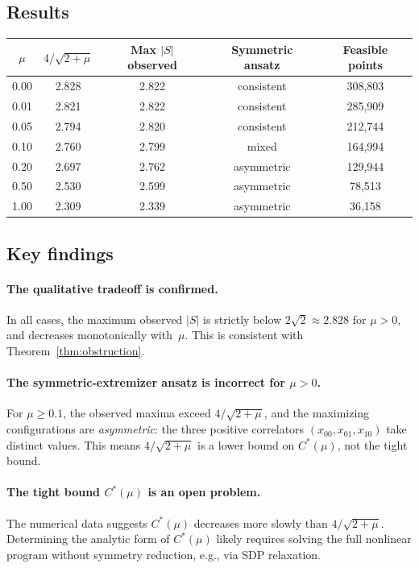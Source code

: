 \documentclass[11pt,a4paper]{article}
\theoremstyle{definition}
\theoremstyle{remark}
\begin{document}
\subsection{Results}

\begin{center}
\begin{tabular}{@{}ccccc@{}}
\toprule
$\mu$ & $4/\sqrt{2+\mu}$ & Max $|S|$ observed & Symmetric ansatz & Feasible points \\
\midrule
0.00 & 2.828 & 2.822 & consistent & 308{,}803 \\
0.01 & 2.821 & 2.822 & consistent & 285{,}909 \\
0.05 & 2.794 & 2.820 & consistent & 212{,}744 \\
0.10 & 2.760 & 2.799 & mixed & 164{,}994 \\
0.20 & 2.697 & 2.762 & asymmetric & 129{,}944 \\
0.50 & 2.530 & 2.599 & asymmetric & 78{,}513 \\
1.00 & 2.309 & 2.339 & asymmetric & 36{,}158 \\
\bottomrule
\end{tabular}
\end{center}

\subsection{Key findings}

\paragraph{The qualitative tradeoff is confirmed.} In all cases, the maximum observed $|S|$ is strictly below $2\sqrt{2} \approx 2.828$ for $\mu > 0$, and decreases monotonically with~$\mu$. This is consistent with Theorem~\ref{thm:obstruction}.

\paragraph{The symmetric-extremizer ansatz is incorrect for $\mu > 0$.} For $\mu \ge 0.1$, the observed maxima exceed $4/\sqrt{2+\mu}$, and the maximizing configurations are \emph{asymmetric}: the three positive correlators $(x_{00}, x_{01}, x_{10})$ take distinct values. This means $4/\sqrt{2+\mu}$ is a lower bound on $C^*(\mu)$, not the tight bound.

\paragraph{The tight bound $C^*(\mu)$ is an open problem.} The numerical data suggests $C^*(\mu)$ decreases more slowly than $4/\sqrt{2+\mu}$. Determining the analytic form of $C^*(\mu)$ likely requires solving the full nonlinear program without symmetry reduction, e.g., via SDP relaxation.
\end{document}
